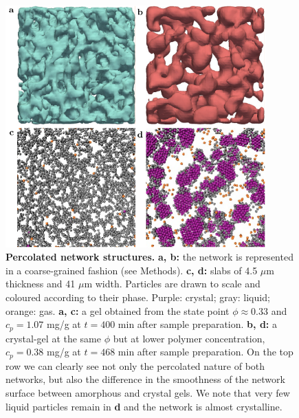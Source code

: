 \documentclass[preprint,amsmath,amssymb,superscriptaddress]{revtex4-1}
\begin{document}
% 

\begin{figure}
 \includegraphics[width=10cm]{network}
\caption{{\bf Percolated network structures.} 
{\bf a, b:} the network is represented in a coarse-grained fashion (see Methods).
{\bf c, d:} slabs of 4.5 $\mu$m thickness and 41 $\mu$m width. Particles are drawn to scale and coloured according to their phase. Purple: crystal; gray: liquid; orange: gas. 
{\bf a, c:} a gel obtained from the state point $\phi\approx 0.33$ and $c_p=1.07$ mg/g at $t=400$ min after sample preparation. 
{\bf b, d:} a crystal-gel at the same $\phi$ but at lower polymer concentration, $c_p=0.38$ mg/g at $t=468$ min after sample preparation. 
On the top row we can clearly see not only the percolated nature of both networks, but also the difference in the smoothness of the network surface between amorphous and crystal gels. 
We note that very few liquid particles remain in \textbf{d} and the network is almost crystalline. 
} 
\label{fig:network}
\end{figure}
\end{document}
